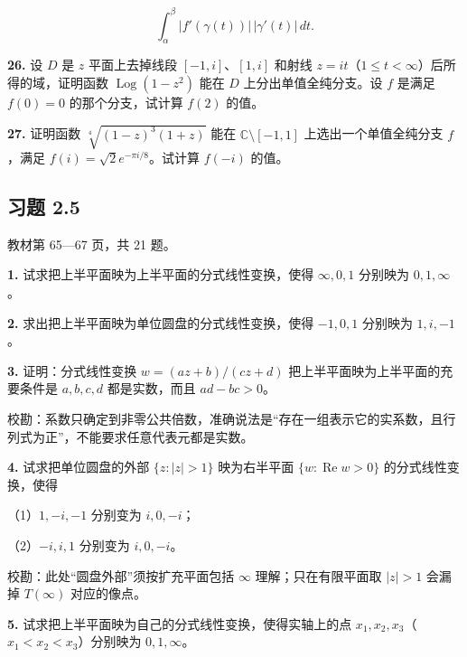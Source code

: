 \documentclass[11pt,a4paper]{article}
\begin{document}
\[
\int_\alpha^\beta|f'(\gamma(t))|\,|\gamma'(t)|\,dt.
\]

\par{}
\noindent\textbf{26.} 设 \(D\) 是 \(z\) 平面上去掉线段 \([-1,i]\)、\([1,i]\)
和射线 \(z=it\)（\(1\le t<\infty\)）后所得的域，证明函数
\(\operatorname{Log}(1-z^2)\) 能在 \(D\) 上分出单值全纯分支。设 \(f\)
是满足 \(f(0)=0\) 的那个分支，试计算 \(f(2)\) 的值。

\par{}
\noindent\textbf{27.} 证明函数 \(\sqrt[4]{(1-z)^3(1+z)}\) 能在
\(\mathbb C\setminus[-1,1]\) 上选出一个单值全纯分支 \(f\)，满足
\(f(i)=\sqrt2e^{-\pi i/8}\)。试计算 \(f(-i)\) 的值。

\subsection{习题 2.5}\label{ch02-practice-ux4e60ux9898-2.5}

教材第 65---67 页，共 21 题。

\par{}
\noindent\textbf{1.} 试求把上半平面映为上半平面的分式线性变换，使得
\(\infty,0,1\) 分别映为 \(0,1,\infty\)。

\par{}
\noindent\textbf{2.} 求出把上半平面映为单位圆盘的分式线性变换，使得 \(-1,0,1\)
分别映为 \(1,i,-1\)。

\par{}
\noindent\textbf{3.} 证明：分式线性变换 \(w=(az+b)/(cz+d)\)
把上半平面映为上半平面的充要条件是 \(a,b,c,d\) 都是实数，而且
\(ad-bc>0\)。

校勘：系数只确定到非零公共倍数，准确说法是``存在一组表示它的实系数，且行列式为正''，不能要求任意代表元都是实数。

\par{}
\noindent\textbf{4.} 试求把单位圆盘的外部 \(\{z:|z|>1\}\) 映为右半平面
\(\{w:\operatorname{Re}w>0\}\) 的分式线性变换，使得

（1）\(1,-i,-1\) 分别变为 \(i,0,-i\)；

（2）\(-i,i,1\) 分别变为 \(i,0,-i\)。

校勘：此处``圆盘外部''须按扩充平面包括 \(\infty\) 理解；只在有限平面取
\(|z|>1\) 会漏掉 \(T(\infty)\) 对应的像点。

\par{}
\noindent\textbf{5.} 试求把上半平面映为自己的分式线性变换，使得实轴上的点
\(x_1,x_2,x_3\)（\(x_1<x_2<x_3\)）分别映为 \(0,1,\infty\)。
\end{document}
